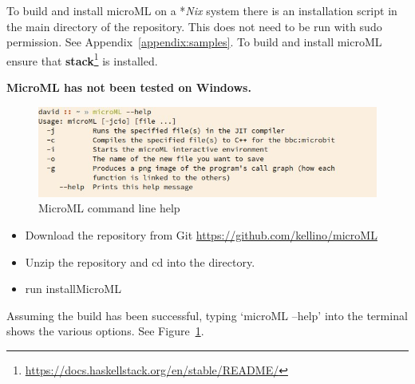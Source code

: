 To build and install microML on a *\textit{Nix} system there is an installation script in the main directory
of the repository. This does not need to be run with sudo permission. See
Appendix~\ref{appendix:samples}.  To build and install microML ensure that
\textbf{stack}\footnote{\url{https://docs.haskellstack.org/en/stable/README/}} is installed. 

\textbf{MicroML has not been tested on Windows.} 

\begin{figure}
    \label{fig:help}
    \includegraphics[width=\textwidth]{images/help.jpg}
    {\caption{MicroML command line help}}
\end{figure}

\begin{itemize}
    \item Download the repository from Git \url{https://github.com/kellino/microML}
    \item Unzip the repository and cd into the directory.
    \item run installMicroML
\end{itemize}

Assuming the build has been successful, typing `microML --help' into the terminal shows the various options. See Figure~\ref{fig:help}.


